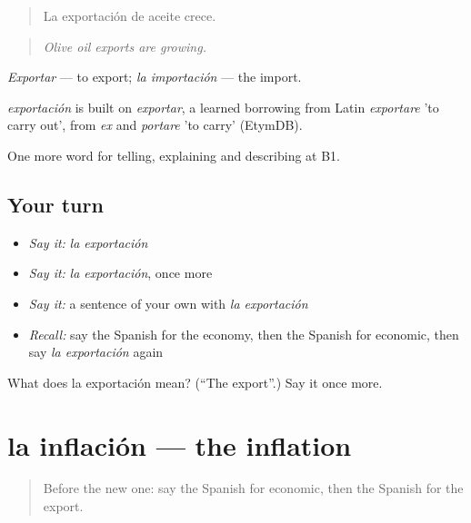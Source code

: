 \begin{quote}
La exportación de aceite crece.
\end{quote}

\begin{quote}
\emph{Olive oil exports are growing.}
\end{quote}

\emph{Exportar} — to export; \emph{la importación} — the import.

\begin{cousinweb}
\emph{exportación} is built on \emph{exportar}, a learned borrowing from Latin \emph{exportare} 'to carry out', from \emph{ex} and \emph{portare} 'to carry' (EtymDB).
\end{cousinweb}

\begin{grammarlens}[title={What you've built}]
One more word for telling, explaining and describing at B1.
\end{grammarlens}

\subsection*{Your turn}
\begin{itemize}
\raggedright
  \item \emph{Say it:} \emph{la exportación}
  \item \emph{Say it:} \emph{la exportación}, once more
  \item \emph{Say it:} a sentence of your own with \emph{la exportación}
  \item \emph{Recall:} say the Spanish for the economy, then the Spanish for economic, then say \emph{la exportación} again
\end{itemize}

\begin{tcolorbox}[breakable,colback=teal!4,colframe=teal!35!black,title={Before you move on}]
What does la exportación mean? (\textquotedblleft{}The export\textquotedblright{}.) Say it once more.
\end{tcolorbox}
\section[la inflación]{la inflación — the inflation}

\label{lesson:ES-C630-inflacion}



\begin{quote}
Before the new one: say the Spanish for economic, then the Spanish for the export.
\end{quote}

